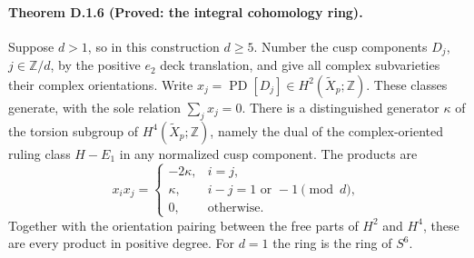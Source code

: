 \paragraph{Theorem D.1.6 (Proved: the integral cohomology ring).}
Suppose $d>1$, so in this construction $d\geq5$. Number the cusp
components $D_j$, $j\in\mathbb Z/d$, by the positive $e_2$ deck
translation, and give all complex subvarieties their complex orientations.
Write $x_j=\operatorname{PD}[D_j]\in H^2(\widetilde X_p;\mathbb Z)$.
These classes generate, with the sole relation $\sum_jx_j=0$.
There is a distinguished generator $\kappa$ of the torsion subgroup of
$H^4(\widetilde X_p;\mathbb Z)$, namely the dual of the complex-oriented
ruling class $H-E_1$ in any normalized cusp component. The products are
\[
 x_i x_j=\begin{cases}
 -2\kappa,&i=j,\\
 \kappa,&i-j=1\text{ or }-1\pmod d,\\
 0,&\text{otherwise}.
 \end{cases}
\]
Together with the orientation pairing between the free parts of $H^2$
and $H^4$, these are every product in positive degree. For $d=1$ the
ring is the ring of $S^6$.
